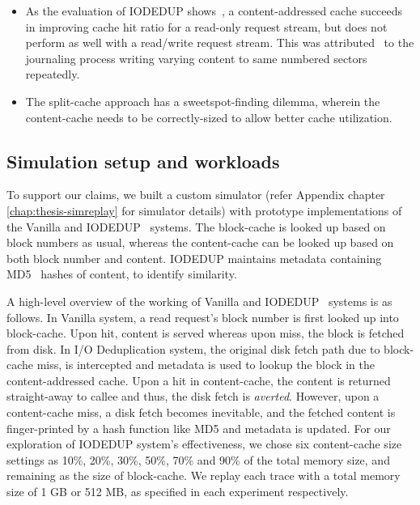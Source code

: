 \begin{itemize}
    \item As the evaluation of IODEDUP shows~\cite{iodedup}, a content-addressed cache
        succeeds in improving cache hit ratio for a read-only request
        stream, but does not perform as well with a read/write request stream.
        This was attributed~\cite{iodedup} to the journaling process writing varying
        content to same numbered sectors repeatedly.
    \item The split-cache approach has a sweetspot-finding dilemma, wherein
        the content-cache needs to be correctly-sized to allow better cache
        utilization.
\end{itemize}

\subsection{Simulation setup and workloads}
To support our claims, we built a custom simulator 
(refer Appendix chapter \ref{chap:thesis-simreplay} for 
simulator details) with prototype implementations of the Vanilla and 
IODEDUP~\cite{iodedup} systems.
The block-cache is looked up 
based on block numbers as usual, whereas
the content-cache can be looked up based on both block number
and content.
IODEDUP maintains metadata containing MD5~\cite{md5}
hashes of content, to identify similarity.

A high-level overview of the working of Vanilla and IODEDUP~\cite{iodedup}
systems is as follows.
In Vanilla system, a read request's block number is first looked up
into block-cache. Upon hit, content is served whereas upon miss,
the block is fetched from disk. In I/O Deduplication system, the
original disk fetch path due to block-cache miss, is
intercepted and metadata is used to lookup the block in
the content-addressed cache.
Upon a hit in content-cache, the content is returned straight-away to callee
and thus, the disk fetch is \textit{averted}.
However, upon a content-cache miss, a
disk fetch becomes inevitable, and the fetched content is finger-printed
by a hash function like MD5 and metadata is updated.
For our exploration of IODEDUP system's effectiveness,
we chose six content-cache size settings as 10\%,
20\%, 30\%, 50\%, 70\% and 90\% of the total memory size, and
remaining as the size of block-cache. We replay each trace
with a total memory size of 1 GB or 512 MB, as specified in each
experiment respectively.

